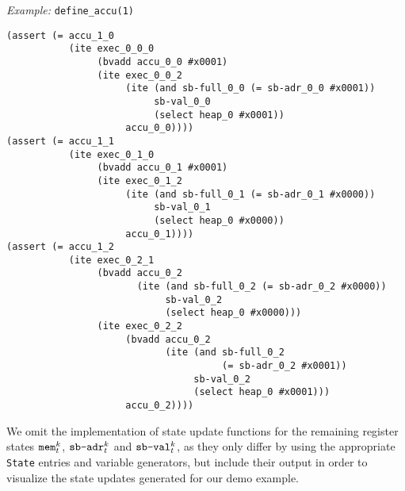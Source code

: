 \noindent
\emph{Example:} \lstinline[style=c++]{define_accu(1)}

\begin{lstlisting}[language=smtlib]
(assert (= accu_1_0
           (ite exec_0_0_0
                (bvadd accu_0_0 #x0001)
                (ite exec_0_0_2
                     (ite (and sb-full_0_0 (= sb-adr_0_0 #x0001))
                          sb-val_0_0
                          (select heap_0 #x0001))
                     accu_0_0))))
(assert (= accu_1_1
           (ite exec_0_1_0
                (bvadd accu_0_1 #x0001)
                (ite exec_0_1_2
                     (ite (and sb-full_0_1 (= sb-adr_0_1 #x0000))
                          sb-val_0_1
                          (select heap_0 #x0000))
                     accu_0_1))))
(assert (= accu_1_2
           (ite exec_0_2_1
                (bvadd accu_0_2
                       (ite (and sb-full_0_2 (= sb-adr_0_2 #x0000))
                            sb-val_0_2
                            (select heap_0 #x0000)))
                (ite exec_0_2_2
                     (bvadd accu_0_2
                            (ite (and sb-full_0_2
                                      (= sb-adr_0_2 #x0001))
                                 sb-val_0_2
                                 (select heap_0 #x0001)))
                     accu_0_2))))
\end{lstlisting}


\noindent
We omit the implementation of state update functions for the remaining register states $\texttt{mem}^k_t$, $\texttt{sb-adr}^k_t$ and $\texttt{sb-val}^k_t$, as they only differ by using the appropriate \texttt{State} entries and variable generators, but include their output in order to visualize the state updates generated for our demo example.


